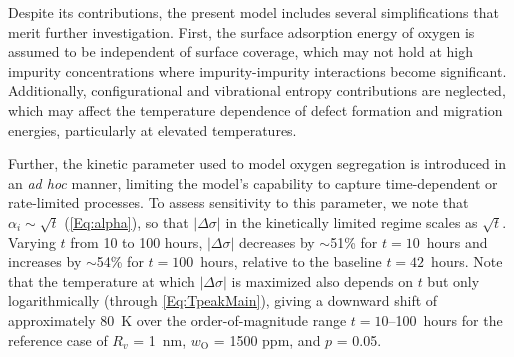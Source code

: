 \documentclass[preprint,12pt,sort&compress]{elsarticle}
\newcommand{\?}{\stackrel{?}{=}}
\begin{document}

Despite its contributions, the present model includes several simplifications that merit further investigation. First, the surface adsorption energy of oxygen is assumed to be independent of surface coverage, which may not hold at high impurity concentrations where impurity-impurity interactions become significant. Additionally, configurational and vibrational entropy contributions are neglected, which may affect the temperature dependence of defect formation and migration energies, particularly at elevated temperatures.

Further, the kinetic parameter used to model oxygen segregation is introduced in an \textit{ad hoc} manner, limiting the model's capability to capture time-dependent or rate-limited processes. To assess sensitivity to this parameter, we note that $\alpha_i \sim \sqrt{t}$ (\cref{Eq:alpha}), so that $|\Delta \sigma|$ in the kinetically limited regime scales as $\sqrt{t}$. Varying $t$ from 10 to 100 hours, $|\Delta \sigma|$ decreases by $\sim$51\% for $t = 10$~hours and increases by $\sim$54\% for $t = 100$~hours, relative to the baseline $t = 42$~hours. Note that the temperature at which $|\Delta \sigma|$ is maximized also depends on $t$ but only logarithmically (through \cref{Eq:TpeakMain}), giving a downward shift of approximately 80~K over the order-of-magnitude range $t = 10$--100~hours for the reference case of $R_v$ = 1~nm, $w_\text{O}$ = 1500 ppm, and $p$ = 0.05.
\end{document}
